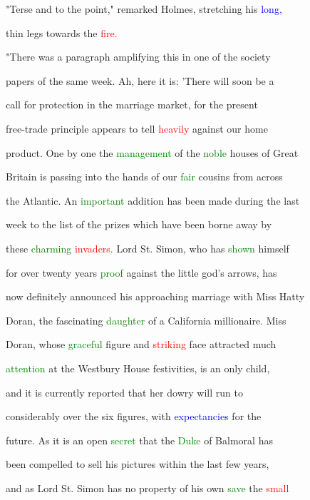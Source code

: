  "Terse and to the point," remarked Holmes, stretching his \textcolor{blue}{long,}

 thin legs towards the \textcolor{red}{fire.}



 "There was a paragraph amplifying this in one of the society

 papers of the same week. Ah, here it is: 'There will soon be a

 call for protection in the \textcolor{BurntOrange}{marriage} market, for the \textcolor{BurntOrange}{present}

 free-trade principle appears to tell \textcolor{red}{heavily} against our home

 product. One by one the \textcolor{green}{management} of the \textcolor{green}{noble} houses of Great

 Britain is passing into the hands of our \textcolor{green}{fair} cousins from across

 the Atlantic. An \textcolor{green}{important} addition has been made during the last

 week to the list of the prizes which have been borne away by

 these \textcolor{green}{charming} \textcolor{red}{invaders.} \textcolor{BurntOrange}{Lord} St. Simon, who has \textcolor{green}{shown} himself

 for over twenty years \textcolor{green}{proof} against the little \textcolor{BurntOrange}{god's} arrows, has

 now definitely announced his approaching \textcolor{BurntOrange}{marriage} with Miss Hatty

 Doran, the fascinating \textcolor{green}{daughter} of a California millionaire. Miss

 Doran, whose \textcolor{green}{graceful} figure and \textcolor{red}{striking} face attracted much

 \textcolor{green}{attention} at the Westbury House festivities, is an only \textcolor{BurntOrange}{child,}

 and it is currently reported that her dowry will run to

 considerably over the six figures, with \textcolor{blue}{expectancies} for the

 future. As it is an open \textcolor{green}{secret} that the \textcolor{green}{Duke} of Balmoral has

 been compelled to sell his pictures within the last few years,

 and as \textcolor{BurntOrange}{Lord} St. Simon has no property of his own \textcolor{green}{save} the \textcolor{red}{small}

